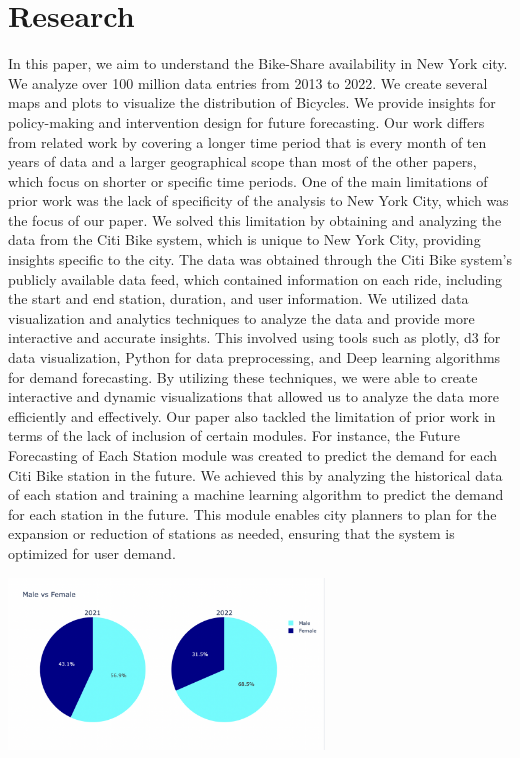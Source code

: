 \documentclass[journal]{vgtc}                     %
\begin{document}
\section{Research}
In this paper, we aim to understand the Bike-Share availability in New York city. We analyze over 100 million data entries from 2013 to 2022. We create several maps and plots to visualize the distribution of Bicycles. We provide insights for policy-making and intervention design for future forecasting. Our work differs from related work by covering a longer time period that is every month of ten years of data and a larger geographical scope than most of the other papers, which focus on shorter or specific time periods. One of the main limitations of prior work was the lack of specificity of the analysis to New York City, which was the focus of our paper\cite{YA}. We solved this limitation by obtaining and analyzing the data from the Citi Bike system, which is unique to New York City, providing insights specific to the city. The data was obtained through the Citi Bike system's publicly available data feed, which contained information on each ride, including the start and end station, duration, and user information.
We utilized data visualization and analytics techniques to analyze the data and provide more interactive and accurate insights. This involved using tools such as plotly, d3 for data visualization, Python for data preprocessing, and Deep learning algorithms for demand forecasting. By utilizing these techniques, we were able to create interactive and dynamic visualizations that allowed us to analyze the data more efficiently and effectively.
Our paper also tackled the limitation of prior work in terms of the lack of inclusion of certain modules. For instance, the Future Forecasting of Each Station module was created to predict the demand for each Citi Bike station in the future. We achieved this by analyzing the historical data of each station and training a machine learning algorithm to predict the demand for each station in the future. This module enables city planners to plan for the expansion or reduction of stations as needed, ensuring that the system is optimized for user demand.
\parbox{\linewidth}{
        \includegraphics[width=3.31in, height=1.8in]{figs/gender.png}\\
        }
\end{document}
